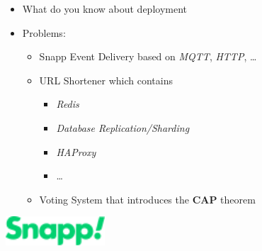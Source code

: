 \documentclass[]{article}
\begin{document}
\begin{multicols}{2}
\begin{itemize}
  \item What do you know about deployment
  \item Problems:
  \begin{itemize}
    \item Snapp Event Delivery based on \textit{MQTT}, \textit{HTTP}, \ldots
    \item URL Shortener which contains
    \begin{itemize}
      \item \textit{Redis}
      \item \textit{Database Replication/Sharding}
      \item \textit{HAProxy}
      \item \ldots
    \end{itemize}
    \item Voting System that introduces the \textbf{CAP} theorem
  \end{itemize}
\end{itemize}

\end{multicols}

\vspace{\fill}
\includegraphics[width=10em]{./snapp.png}
\end{document}
